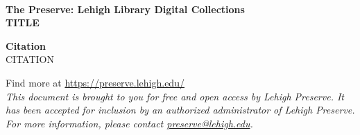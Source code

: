 \documentclass{article}
\begin{document}
\begin{titlepage}
    \begin{center}
        \vspace*{2cm}

        \\[1cm]
        {\Large\bfseries The Preserve: Lehigh Library Digital Collections}\\[2cm]

        {\Huge\bfseries \noindent TITLE}\\[3cm]
    \end{center}

    {\large \noindent \textbf{Citation}}\\[0.25cm]
    {\large \noindent CITATION}\\[1cm]

    \vfill

    \begin{center}
        {\sffamily Find more at \href{https://preserve.lehigh.edu/}{https://preserve.lehigh.edu/}}\\[0.5cm]

        {\sffamily\textit{This document is brought to you for free and open access by Lehigh Preserve. It has been accepted for inclusion by an authorized administrator of Lehigh Preserve. For more information, please contact \href{mailto:preserve@lehigh.edu}{preserve@lehigh.edu}.}}
    \end{center}
\end{titlepage}
\end{document}
